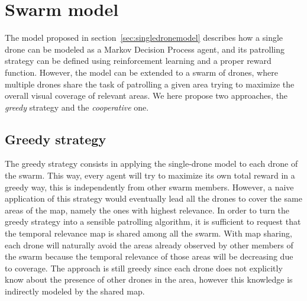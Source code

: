 \documentclass{article}
\begin{document}
\section{Swarm model}
\label{sec:swarm}
The model proposed in section~\ref{sec:singledronemodel} describes how a single drone can be modeled as a Markov Decision Process agent, and its patrolling strategy can be defined using reinforcement learning and a proper reward function. However, the model can be extended to a swarm of drones, where multiple drones share the task of patrolling a given area trying to maximize the overall visual coverage of relevant areas. We here propose two approaches, the \emph{greedy} strategy and the \emph{cooperative} one.

\subsection{Greedy strategy}
\label{subsec:greedy}
The greedy strategy consists in applying the single-drone model to each drone of the swarm. This way, every agent will try to maximize its own total reward in a greedy way, this is independently from other swarm members. However, a naive application of this strategy would eventually lead all the drones to cover the same areas of the map, namely the ones with highest relevance. In order to turn the greedy strategy into a sensible patrolling algorithm, it is sufficient to request that the temporal relevance map is shared among all the swarm. With map sharing, each drone will naturally avoid the areas already observed by other members of the swarm because the temporal relevance of those areas will be decreasing due to coverage. The approach is still greedy since each drone does not explicitly know about the presence of other drones in the area, however this knowledge is indirectly modeled by the shared map. 
\end{document}
